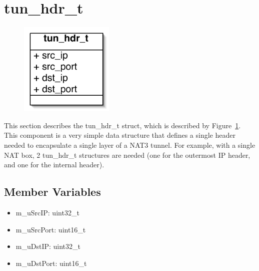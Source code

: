 \section{tun\_hdr\_t}\label{sec:tunhdr}

\begin{figure}
\begin{center}
\includegraphics[width=0.4\textwidth]{figs/tunhdr}
\end{center}
\caption{}
\label{fig:tunhdr}
\end{figure}

This section describes the tun\_hdr\_t struct, which is described by Figure~\ref{fig:tunhdr}.  This component is a very simple data
structure that defines a single header needed to encapsulate a single layer of a NAT3 tunnel.  For example, with a single NAT box, 2
tun\_hdr\_t structures are needed (one for the outermost IP header, and one for the internal header).


\subsection{Member Variables}

\begin{itemize}
\item m\_uSrcIP: uint32\_t
\item m\_uSrcPort: uint16\_t
\item m\_uDstIP: uint32\_t
\item m\_uDstPort: uint16\_t
\end{itemize}


